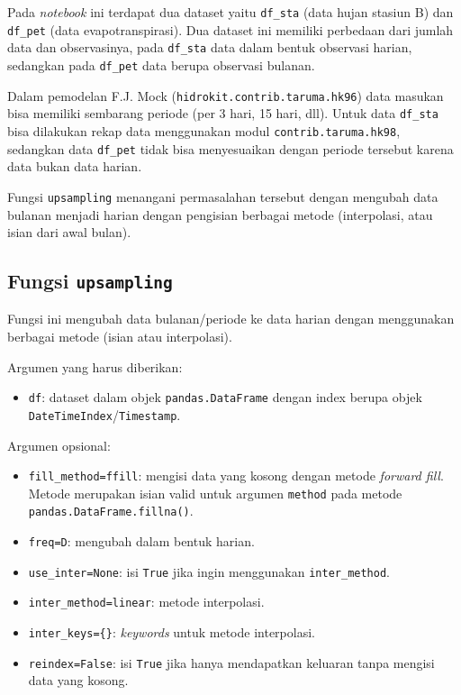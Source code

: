 \documentclass[11pt]{article}
\providecommand{\tightlist}{%
      \setlength{\itemsep}{0pt}\setlength{\parskip}{0pt}}
\begin{document}
Pada \emph{notebook} ini terdapat dua dataset yaitu \texttt{df\_sta}
(data hujan stasiun B) dan \texttt{df\_pet} (data evapotranspirasi). Dua
dataset ini memiliki perbedaan dari jumlah data dan observasinya, pada
\texttt{df\_sta} data dalam bentuk observasi harian, sedangkan pada
\texttt{df\_pet} data berupa observasi bulanan.

Dalam pemodelan F.J. Mock (\texttt{hidrokit.contrib.taruma.hk96}) data
masukan bisa memiliki sembarang periode (per 3 hari, 15 hari, dll).
Untuk data \texttt{df\_sta} bisa dilakukan rekap data menggunakan modul
\texttt{contrib.taruma.hk98}, sedangkan data \texttt{df\_pet} tidak bisa
menyesuaikan dengan periode tersebut karena data bukan data harian.

Fungsi \texttt{upsampling} menangani permasalahan tersebut dengan
mengubah data bulanan menjadi harian dengan pengisian berbagai metode
(interpolasi, atau isian dari awal bulan).

    \hypertarget{fungsi-upsampling}{%
\subsection{\texorpdfstring{Fungsi
\texttt{upsampling}}{Fungsi upsampling}}\label{fungsi-upsampling}}

Fungsi ini mengubah data bulanan/periode ke data harian dengan
menggunakan berbagai metode (isian atau interpolasi).

Argumen yang harus diberikan:

\begin{itemize}
\tightlist
\item
  \texttt{df}: dataset dalam objek \texttt{pandas.DataFrame} dengan
  index berupa objek \texttt{DateTimeIndex}/\texttt{Timestamp}.
\end{itemize}

Argumen opsional:

\begin{itemize}
\tightlist
\item
  \texttt{fill\_method=\textquotesingle{}ffill\textquotesingle{}}:
  mengisi data yang kosong dengan metode \emph{forward fill}. Metode
  merupakan isian valid untuk argumen \texttt{method} pada metode
  \texttt{pandas.DataFrame.fillna()}.
\item
  \texttt{freq=\textquotesingle{}D\textquotesingle{}}: mengubah dalam
  bentuk harian.
\item
  \texttt{use\_inter=None}: isi \texttt{True} jika ingin menggunakan
  \texttt{inter\_method}.
\item
  \texttt{inter\_method=\textquotesingle{}linear\textquotesingle{}}:
  metode interpolasi.
\item
  \texttt{inter\_keys=\{\}}: \emph{keywords} untuk metode interpolasi.
\item
  \texttt{reindex=False}: isi \texttt{True} jika hanya mendapatkan
  keluaran tanpa mengisi data yang kosong.
\end{itemize}
\end{document}
